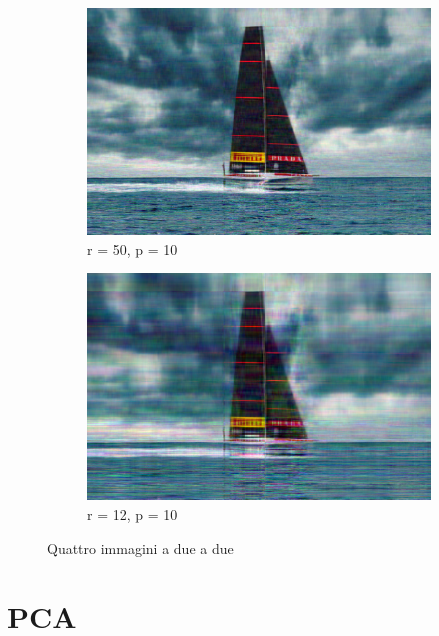\documentclass{article}
\begin{document}
\begin{figure}[h]
  \begin{subfigure}{0.45\textwidth}
    \includegraphics[width=\linewidth]{luna_rossa_out5010.png}
    \caption{r = 50, p = 10}
    \label{fig:sub3}
  \end{subfigure}
  \hfill
  \begin{subfigure}{0.45\textwidth}
    \includegraphics[width=\linewidth]{luna_rossa_out1210.png}
    \caption{r = 12, p = 10}
    \label{fig:sub4}
  \end{subfigure}

  \caption{Quattro immagini a due a due}
  \label{fig:all}
\end{figure}




\section{PCA}
\end{document}
